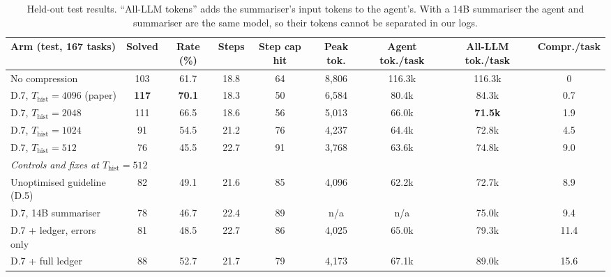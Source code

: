 \documentclass[10pt,a4paper]{article}
\begin{document}
\begin{table}[h]
\centering
\scriptsize
\renewcommand{\arraystretch}{1.12}
\setlength{\tabcolsep}{2.2pt}
\begin{tabular}{lcccccccc}
\toprule
\textbf{Arm (test, 167 tasks)} & \textbf{Solved} & \textbf{Rate (\%)} & \textbf{Steps} &
\textbf{Step cap hit} & \textbf{Peak tok.} & \textbf{Agent tok./task} & \textbf{All-LLM tok./task} &
\textbf{Compr./task}\\
\midrule
No compression & 103 & 61.7 & 18.8 & 64 & 8,806 & 116.3k & 116.3k & 0\\
\midrule
D.7, $T_{\mathrm{hist}}=4096$ (paper) & \textbf{117} & \textbf{70.1} & 18.3 & 50 & 6,584 & 80.4k & 84.3k & 0.7\\
D.7, $T_{\mathrm{hist}}=2048$ & 111 & 66.5 & 18.6 & 56 & 5,013 & 66.0k & \textbf{71.5k} & 1.9\\
D.7, $T_{\mathrm{hist}}=1024$ & 91 & 54.5 & 21.2 & 76 & 4,237 & 64.4k & 72.8k & 4.5\\
D.7, $T_{\mathrm{hist}}=512$ & 76 & 45.5 & 22.7 & 91 & 3,768 & 63.6k & 74.8k & 9.0\\
\midrule
\multicolumn{9}{l}{\emph{Controls and fixes at $T_{\mathrm{hist}}=512$}}\\
Unoptimised guideline (D.5) & 82 & 49.1 & 21.6 & 85 & 4,096 & 62.2k & 72.7k & 8.9\\
D.7, 14B summariser & 78 & 46.7 & 22.4 & 89 & n/a & n/a & 75.0k & 9.4\\
D.7 + ledger, errors only & 81 & 48.5 & 22.7 & 86 & 4,025 & 65.0k & 79.3k & 11.4\\
D.7 + full ledger & 88 & 52.7 & 21.7 & 79 & 4,173 & 67.1k & 89.0k & 15.6\\
\bottomrule
\end{tabular}
\caption{Held-out test results. ``All-LLM tokens'' adds the summariser's input
tokens to the agent's. With a 14B summariser the agent and summariser are the
same model, so their tokens cannot be separated in our logs.}
\label{tab:test}
\end{table}
\end{document}
